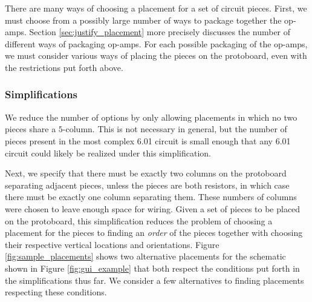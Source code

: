 There are many ways of choosing a placement for a set of circuit pieces.
First, we must choose from a possibly large number of ways
to package together the op-amps. Section \ref{sec:justify_placement} more
precisely discusses the number of different ways of packaging op-amps.
For each possible packaging of the
op-amps, we must consider various ways of placing the pieces on the protoboard,
even with the restrictions put forth above.

\subsubsection{Simplifications}

We reduce the number of options by only allowing placements in which no
two pieces share a $5$-column. This is not necessary in general, but the
number of pieces present in the most complex 6.01 circuit is small enough that
any 6.01 circuit could likely be realized under this simplification.

Next, we specify that there must be exactly two columns on the protoboard
separating adjacent pieces, unless the pieces are both resistors, in which
case there must be exactly one column separating them. These numbers of columns
were chosen to leave enough space for wiring. Given a set of pieces to be placed
on the protoboard, this simplification reduces the
problem of choosing a placement for the pieces to finding an \emph{order} of the
pieces together with choosing their respective vertical locations and
orientations. Figure \ref{fig:sample_placements} shows two alternative
placements for the schematic shown in Figure \ref{fig:gui_example} that both
respect the conditions put forth in the simplifications thus far.
We consider a few alternatives to finding placements respecting these conditions.

